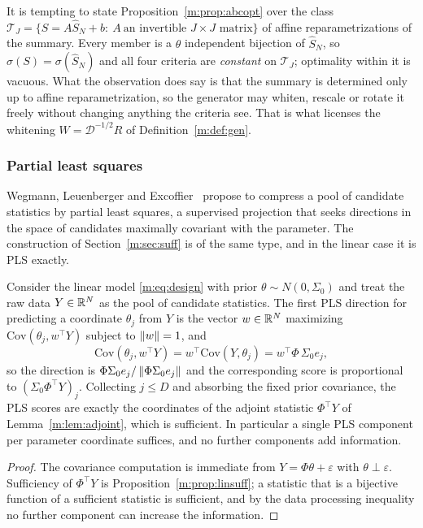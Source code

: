 \begin{remark}\label{m:rem:affineclass}
It is tempting to state Proposition~\ref{m:prop:abcopt} over the class $\mathcal T_J=\{S=A\hat S_N+b:\ A\ \text{an invertible }J\times J\text{ matrix}\}$ of affine reparametrizations of the summary. Every member is a $\theta$ independent bijection of $\hat S_N$, so $\sigma(S)=\sigma(\hat S_N)$ and all four criteria are \emph{constant} on $\mathcal T_J$; optimality within it is vacuous. What the observation does say is that the summary is determined only up to affine reparametrization, so the generator may whiten, rescale or rotate it freely without changing anything the criteria see. That is what licenses the whitening $W=\mathcal D^{-1/2}R$ of Definition~\ref{m:def:gen}.
\end{remark}

\subsubsection{Partial least squares} Wegmann, Leuenberger and Excoffier~\cite{wegmann2009} propose to compress a pool of candidate statistics by partial least squares, a supervised projection that seeks directions in the space of candidates maximally covariant with the parameter. The construction of Section~\ref{m:sec:suff} is of the same type, and in the linear case it is PLS exactly.

\begin{proposition}\label{m:prop:pls}
Consider the linear model \eqref{m:eq:design} with prior $\theta\sim N(0,\Sigma_0)$ and treat the raw data $Y\in\mathbb{R}^N$ as the pool of candidate statistics. The first PLS direction for predicting a coordinate $\theta_j$ from $Y$ is the vector $w\in\mathbb{R}^N$ maximizing $\mathrm{Cov}(\theta_j,w^\top Y)$ subject to $\left\|w\right\|=1$, and
\[
\mathrm{Cov}(\theta_j,w^\top Y)=w^\top\mathrm{Cov}(Y,\theta_j)=w^\top\Phi\,\Sigma_0e_j ,
\]
so the direction is $\Phi\Sigma_0e_j/\left\|\Phi\Sigma_0e_j\right\|$ and the corresponding score is proportional to $(\Sigma_0\Phi^\top Y)_j$. Collecting $j\le D$ and absorbing the fixed prior covariance, the PLS scores are exactly the coordinates of the adjoint statistic $\Phi^\top Y$ of Lemma~\ref{m:lem:adjoint}, which is sufficient. In particular a single PLS component per parameter coordinate suffices, and no further components add information.
\end{proposition}

\begin{proof}
The covariance computation is immediate from $Y=\Phi\theta+\varepsilon$ with $\theta\perp\varepsilon$. Sufficiency of $\Phi^\top Y$ is Proposition~\ref{m:prop:linsuff}; a statistic that is a bijective function of a sufficient statistic is sufficient, and by the data processing inequality no further component can increase the information.
\end{proof}

